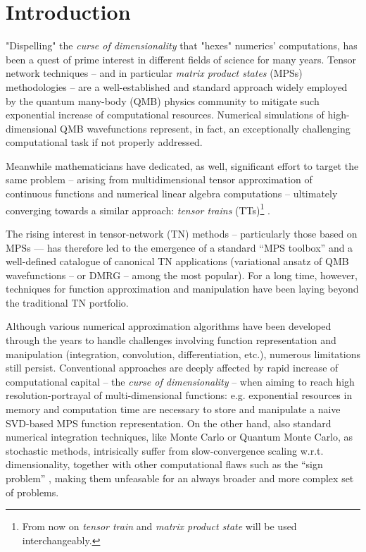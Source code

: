 \chapter{Introduction}
\label{chap:intro}
"Dispelling" the \textit{curse of dimensionality} that "hexes" numerics' computations, has been a quest of prime interest in different fields of science for many years. 
Tensor network techniques -- and in particular \textit{matrix product states} (MPSs) methodologies -- are a well-established \cite{Fannes1992,White1992,Schollwock2011,Vidal2003,VerstraeteCirac2004,vonDelftTNNotes,tensornetwork.org} and standard approach widely employed by the quantum many-body (QMB) physics community to mitigate such exponential increase of computational resources. Numerical simulations of high-dimensional QMB wavefunctions represent, in fact, an exceptionally challenging computational task if not properly addressed.

Meanwhile mathematicians have dedicated, as well, significant effort to target the same problem -- arising from multidimensional tensor approximation of continuous functions and numerical linear algebra computations \cite{Oseledets2009Intro, Kolda2009} -- ultimately converging towards a similar approach: \textit{tensor trains} (TTs)\footnote{From now on \textit{tensor train} and \textit{matrix product state} will be used interchangeably.} \cite{Oseledets2011}. 

The rising interest in tensor-network (TN) methods -- particularly those based on MPSs — has therefore led to the emergence of a standard ``MPS toolbox'' \cite{ttpylib, ITensors.jl, QSpace} and a well-defined catalogue of canonical TN applications \cite{Verstraete2008} (variational ansatz of QMB wavefunctions -- or DMRG -- among the most popular). For a long time, however, techniques for function approximation and manipulation have been laying beyond the traditional TN portfolio.

Although various numerical approximation algorithms have been developed through the years to handle challenges involving function representation and manipulation \cite{Isaacson1994} (integration, convolution, differentiation, etc.), numerous limitations still persist. Conventional approaches are deeply affected by rapid increase of computational capital -- the \textit{curse of dimensionality} -- when aiming to reach high resolution-portrayal of multi-dimensional functions: e.g. exponential resources in memory and computation time are necessary to store and manipulate a naive SVD-based MPS function representation. On the other hand, also standard numerical integration techniques, like Monte Carlo or Quantum Monte Carlo, as stochastic methods, intrisically suffer from slow-convergence scaling w.r.t. dimensionality, together with other computational flaws such as the ``sign problem'' \cite{Loh1990}, making them unfeasable for an always broader and more complex set of problems.  

